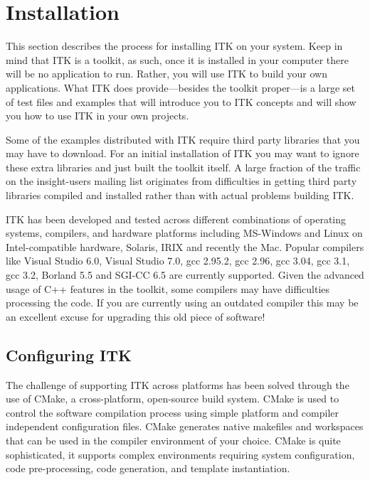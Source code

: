 \chapter{Installation}
\label{chapter:Installation}


This section describes the process for installing ITK on your system. Keep in
mind that ITK is a toolkit, as such, once it is installed in your computer
there will be no application to run. Rather, you will use ITK to build your
own applications. What ITK does provide---besides the toolkit proper---is a
large set of test files and examples that will introduce you to ITK concepts
and will show you how to use ITK in your own projects.

Some of the examples distributed with ITK require third party libraries that
you may have to download. For an initial installation of ITK you may want to
ignore these extra libraries and just built the toolkit itself. A large
fraction of the traffic on the insight-users mailing list originates from
difficulties in getting third party libraries compiled and installed rather
than with actual problems building ITK.

ITK has been developed and tested across different combinations of operating
systems, compilers, and hardware platforms including MS-Windows and Linux on
Intel-compatible hardware, Solaris, IRIX and recently the Mac. Popular
compilers like Visual Studio 6.0, Visual Studio 7.0, gcc 2.95.2, gcc 2.96,
gcc 3.04, gcc 3.1, gcc 3.2, Borland 5.5 and SGI-CC 6.5 are currently
supported. Given the advanced usage of C++ features in the toolkit, some
compilers may have difficulties processing the code. If you are currently
using an outdated compiler this may be an excellent excuse for upgrading this
old piece of software!

\section{Configuring ITK}
\label{sec:ConfiguringITK}

 
The challenge of supporting ITK across platforms has been solved through the
use of CMake, a cross-platform, open-source build system. CMake is used to
control the software compilation process using simple platform and compiler
independent configuration files.  CMake generates native makefiles and
workspaces that can be used in the compiler environment of your choice. CMake
is quite sophisticated, it supports complex environments requiring system
configuration, code pre-processing, code generation, and template
instantiation.

